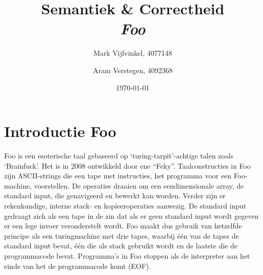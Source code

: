 \documentclass[11pt]{article}
\title{\textbf{Semantiek \& Correctheid \\ \emph{Foo}}}
\author{
	Mark Vijfvinkel, 4077148
	\and Aram Verstegen, 4092368
}
\date{\today}
\begin{document}
\maketitle


\section{Introductie Foo}

Foo is een esoterische taal gebaseerd op `turing-tarpit'-achtige talen zoals `Brainfuck'. Het is in 2008 ontwikkeld door ene ``Feky''.
Taalconstructies in Foo zijn ASCII-strings die een tape met instructies, het programma voor een Foo-machine, voorstellen.
De operaties draaien om een eendimensionale array, de standard input, die genavigeerd en bewerkt kan worden.
Verder zijn er rekenkundige, interne stack- en kopieeroperaties aanwezig.
De standard input gedraagt zich als een tape in de zin dat als er geen standard input wordt gegeven er een lege invoer veronderstelt wordt. 
Foo maakt dus gebruik van hetzelfde principe als een turingmachine met drie tapes, waarbij \'e\'en van de tapes de standard input bevat, \'e\'en die als stack gebruikt wordt en de laatste die de programmacode bevat. %
Programma's in Foo stoppen als de interpreter aan het einde van het de programmacode komt (EOF).
\end{document}
